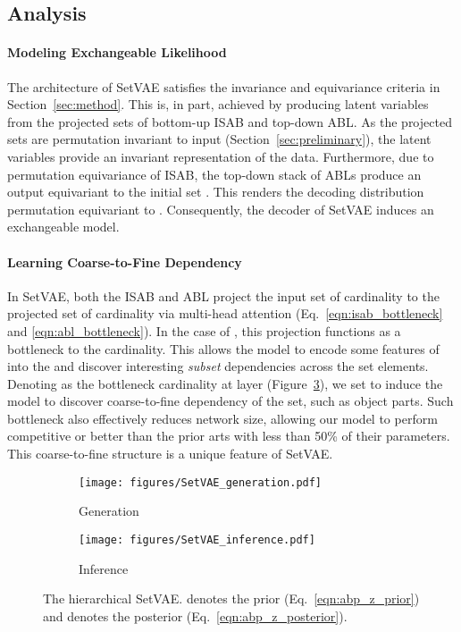 \documentclass[final]{arxiv/cvpr}
\newcommand{\cutparagraphup}{\vspace*{-0.1in}}
\begin{document}
\subsection{Analysis}
\paragraph{Modeling Exchangeable Likelihood}
The architecture of SetVAE satisfies the invariance and equivariance criteria in Section~\ref{sec:method}.
This is, in part, achieved by producing latent variables from the projected sets of bottom-up ISAB and top-down ABL.
As the projected sets are permutation invariant to input (Section~\ref{sec:preliminary}), the latent variables  provide an invariant representation of the data.
Furthermore, due to permutation equivariance of ISAB, the top-down stack of ABLs produce an output equivariant to the initial set . This renders the decoding distribution  permutation equivariant to .
Consequently, the decoder of SetVAE induces an exchangeable model.

\cutparagraphup
\paragraph{Learning Coarse-to-Fine Dependency}
In SetVAE, both the ISAB and ABL project the input set  of cardinality  to the projected set  of cardinality  via multi-head attention (Eq.~\eqref{eqn:isab_bottleneck} and \eqref{eqn:abl_bottleneck}).
In the case of , this projection functions as a bottleneck to the cardinality.
This allows the model to encode some features of  into the  and discover interesting \emph{subset} dependencies across the set elements.
Denoting  as the bottleneck cardinality at layer  (Figure~\ref{fig:overview}), we set  to induce the model to discover coarse-to-fine dependency of the set, such as object parts.
Such bottleneck also effectively reduces network size, allowing our model to perform competitive or better than the prior arts with less than 50\% of their parameters.
This coarse-to-fine structure is a unique feature of SetVAE.

\begin{figure}[t!]
    \centering
    \begin{subfigure}[b]{0.17\textwidth}
        \centering
        \texttt{[image: figures/SetVAE\_generation.pdf]}
        \vspace{-0.1cm}
        \caption{Generation}
        \label{fig:setvae_generation}
    \end{subfigure}
    \hfill
    \begin{subfigure}[b]{0.3\textwidth}
        \centering
        \texttt{[image: figures/SetVAE\_inference.pdf]}
        \vspace{-0.1cm}
        \caption{Inference}
        \label{fig:setvae_inference}
    \end{subfigure}
    \vspace{-0.6cm}
    \caption{The hierarchical SetVAE.
     denotes the prior (Eq.~\eqref{eqn:abp_z_prior}) and  denotes the posterior (Eq.~\eqref{eqn:abp_z_posterior}).
    }
    \vspace{-0.5cm}
\label{fig:overview}
\end{figure}
\end{document}
